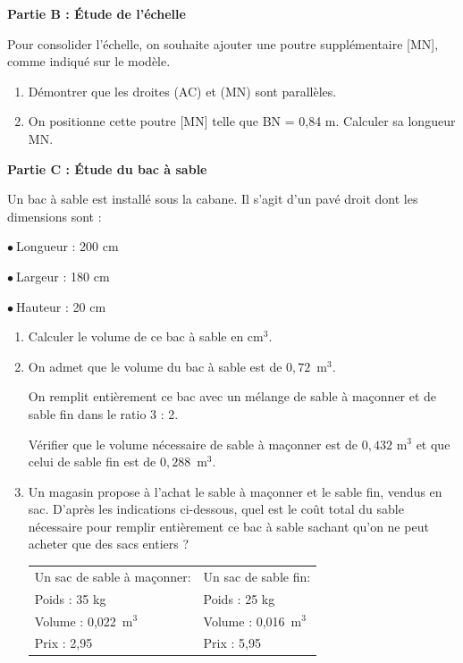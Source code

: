 \documentclass[11pt]{article}
\newcommand{\euro}{\eurologo{}}
\begin{document}
\medskip

\textbf{Partie B : Étude de l'échelle}

\medskip

Pour consolider l'échelle, on souhaite ajouter une poutre supplémentaire [MN], comme indiqué sur le modèle.

\medskip

\begin{enumerate}
\item Démontrer que les droites (AC) et (MN) sont parallèles.
\item On positionne cette poutre [MN] telle que BN = 0,84 m. Calculer sa longueur MN.
\end{enumerate}

\medskip

\textbf{Partie C : Étude du bac à sable}

\medskip

Un bac à sable est installé sous la cabane. Il s'agit d'un pavé droit dont les dimensions sont :

$\bullet~$Longueur : 200 cm

$\bullet~$Largeur : 180 cm

$\bullet~$Hauteur : 20 cm

\medskip

\begin{enumerate}
\item Calculer le volume de ce bac à sable en cm$^3$.
\item On admet que le volume du bac à sable est de $0,72$~m$^3$.

On remplit entièrement ce bac avec un mélange de sable à maçonner et de sable fin dans le ratio 3 : 2.

Vérifier que le volume nécessaire de sable à maçonner est de $0,432$ m$^3$ et que celui de sable fin est de $0,288$~m$^3$.
\item Un magasin propose à l'achat le sable à maçonner et le sable fin, vendus en sac. D'après les indications ci-dessous, quel est le coût total du sable nécessaire pour remplir entièrement ce bac à sable sachant qu'on ne peut acheter que des sacs entiers ?

\begin{center}
\begin{tabular}{l |l}
Un  sac de sable à maçonner:& Un sac de sable fin:\\
Poids : 35 kg&Poids : 25 kg\\
Volume : 0,022~m$^3$&Volume : 0,016~m$^3$\\
Prix : 2,95~\euro&Prix : 5,95~\euro\\
\end{tabular}
\end{center}
\end{enumerate}
\end{document}
